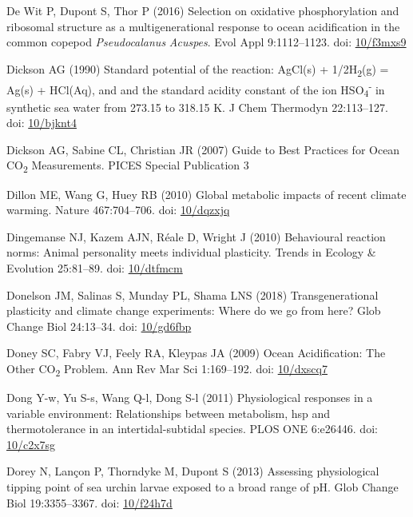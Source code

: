 \documentclass[a4paper,10pt, oneside]{memoir}
\begin{document}
\leavevmode\hypertarget{ref-DeWit2016}{}%
De Wit P, Dupont S, Thor P (2016) Selection on oxidative phosphorylation and ribosomal structure as a multigenerational response to ocean acidification in the common copepod \emph{Pseudocalanus} \emph{Acuspes}. Evol Appl 9:1112--1123. doi: \href{https://doi.org/10/f3mxs9}{10/f3mxs9}

\leavevmode\hypertarget{ref-Dickson1990}{}%
Dickson AG (1990) Standard potential of the reaction: AgCl(s) + 1/2H\textsubscript{2}(g) = Ag(s) + HCl(Aq), and and the standard acidity constant of the ion HSO\textsubscript{4}\textsuperscript{-} in synthetic sea water from 273.15 to 318.15 K. J Chem Thermodyn 22:113--127. doi: \href{https://doi.org/10/bjknt4}{10/bjknt4}

\leavevmode\hypertarget{ref-Dickson2007}{}%
Dickson AG, Sabine CL, Christian JR (2007) Guide to Best Practices for Ocean CO\textsubscript{2} Measurements. PICES Special Publication 3

\leavevmode\hypertarget{ref-Dillon2010}{}%
Dillon ME, Wang G, Huey RB (2010) Global metabolic impacts of recent climate warming. Nature 467:704--706. doi: \href{https://doi.org/10/dqzxjq}{10/dqzxjq}

\leavevmode\hypertarget{ref-Dingemanse2010}{}%
Dingemanse NJ, Kazem AJN, Réale D, Wright J (2010) Behavioural reaction norms: Animal personality meets individual plasticity. Trends in Ecology \& Evolution 25:81--89. doi: \href{https://doi.org/10/dtfmcm}{10/dtfmcm}

\leavevmode\hypertarget{ref-Donelson2018}{}%
Donelson JM, Salinas S, Munday PL, Shama LNS (2018) Transgenerational plasticity and climate change experiments: Where do we go from here? Glob Change Biol 24:13--34. doi: \href{https://doi.org/10/gd6fbp}{10/gd6fbp}

\leavevmode\hypertarget{ref-Doney2009}{}%
Doney SC, Fabry VJ, Feely RA, Kleypas JA (2009) Ocean Acidification: The Other CO\textsubscript{2} Problem. Ann Rev Mar Sci 1:169--192. doi: \href{https://doi.org/10/dxscq7}{10/dxscq7}

\leavevmode\hypertarget{ref-Dong2011}{}%
Dong Y-w, Yu S-s, Wang Q-l, Dong S-l (2011) Physiological responses in a variable environment: Relationships between metabolism, hsp and thermotolerance in an intertidal-subtidal species. PLOS ONE 6:e26446. doi: \href{https://doi.org/10/c2x7sg}{10/c2x7sg}

\leavevmode\hypertarget{ref-Dorey2013}{}%
Dorey N, Lançon P, Thorndyke M, Dupont S (2013) Assessing physiological tipping point of sea urchin larvae exposed to a broad range of pH. Glob Change Biol 19:3355--3367. doi: \href{https://doi.org/10/f24h7d}{10/f24h7d}
\end{document}
